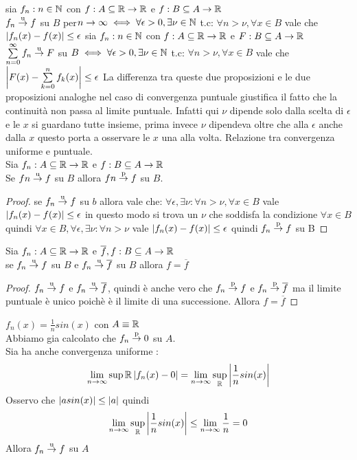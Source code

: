 \proposition
sia $f_n:n\in\mathbb{N}$ con $f:A\subseteq \mathbb{R}\to \mathbb{R}$ e $f:B\subseteq A \to  \mathbb{R}$\\
$f_n \overset{\text{u}}{\to} f$ su $B$ per$n\to\infty \iff \forall\epsilon >0, \exists\nu\in\mathbb{N}$  t.c: $\forall n>\nu, \forall x\in B$ vale che $\left|f_n(x)-f(x)\right|\le\epsilon$
\proposition
sia $f_n:n\in\mathbb{N}$ con $f:A\subseteq \mathbb{R}\to \mathbb{R}$ e $F:B\subseteq A \to  \mathbb{R}$\\
$\sum\limits_{n=0}^{\infty}f_n \overset{\text{u}}{\to} F$ su $B\iff \forall\epsilon >0, \exists\nu\in\mathbb{N}$  t.c: $\forall n>\nu, \forall x\in B$ vale che $\left|F(x)-\sum\limits_{k=0}^{n}f_k(x)\right|\le\epsilon$
\observation
La differenza tra queste due proposizioni e le due proposizioni analoghe nel caso di convergenza puntuale giustifica il fatto che la continuità non passa al limite puntuale. Infatti qui $\nu$ dipende solo dalla scelta di $\epsilon$ e le $x$ si guardano tutte insieme, prima invece $\nu$ dipendeva oltre che alla $\epsilon$ anche dalla $x$ questo porta a osservare le $x$ una alla volta.
\proposition Relazione tra convergenza uniforme e puntuale.\\
Sia $f_n:A\subseteq \mathbb{R}\to \mathbb{R}$ e $f:B\subseteq A\to \mathbb{R}$\\
Se $fn \overset{\text{u}}{\to} f$ su $B$ allora $fn \overset{\text{p}}{\to} f$ su $B$.
\begin{proof}
	se $f_n \overset{\text{u}}{\to} f$ su $b$ allora vale che:
	$\forall\epsilon, \exists\nu : \forall n>\nu, \forall x\in B $ vale $\left|f_n(x)-f(x)\right|\le\epsilon$ in questo modo si trova un $\nu$ che soddisfa la condizione $\forall x \in B$ quindi $\forall x\in B, \forall\epsilon, \exists\nu : \forall n>\nu $ vale $\left|f_n(x)-f(x)\right|\le\epsilon$ quindi $f_n \overset{\text{p}}{\to} f$ su B
\end{proof}
\proposition
Sia $f_n:A\subseteq \mathbb{R}\to \mathbb{R}$ e $\overline{f},f:B\subseteq A\to \mathbb{R}$\\
se $f_n \overset{\text{u}}{\to} f$ su $B$ e $f_n \overset{\text{u}}{\to} \overline{f}$ su $B$ allora $f=\overline{f}$
\begin{proof}
	$f_n \overset{\text{u}}{\to} f$ e $f_n \overset{\text{u}}{\to} \overline{f}$, quindi è anche vero che $f_n \overset{\text{p}}{\to} f$ e $f_n \overset{\text{p}}{\to} \overline{f}$ ma il limite puntuale è unico poichè è il limite di una successione. Allora $f=\overline{f}$
\end{proof}
\example $f_n(x)=\frac{1}{n}sin(x)$ con $A\equiv \mathbb{R}$\\
Abbiamo gia calcolato che $f_n \overset{\text{p}}{\to} 0$ su $A$.\\
Sia ha anche convergenza uniforme :\\
\[\lim\limits_{n\to\infty}\sup{ \mathbb{R}}\left|f_n(x)-0\right| = \lim\limits_{n\to\infty}\sup\limits_{ \mathbb{R}}\left|\frac{1}{n}sin(x)\right|\]
Osservo che $\left|asin(x)\right|\le\left|a\right|$ quindi
\[\lim\limits_{n\to\infty}\sup\limits_{ \mathbb{R}}\left|\frac{1}{n}sin(x)\right|\le\lim\limits_{n\to\infty}\frac{1}{n}=0\]
Allora $f_n \overset{\text{u}}{\to} f$ su $A$

